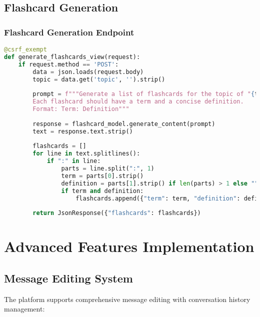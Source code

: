 \documentclass[12pt,a4paper]{article}
\begin{document}
\subsection{Flashcard Generation}

\subsubsection{Flashcard Generation Endpoint}

\begin{lstlisting}[language=Python, caption=Flashcard Generation System]
@csrf_exempt
def generate_flashcards_view(request):
    if request.method == 'POST':
        data = json.loads(request.body)
        topic = data.get('topic', '').strip()
        
        prompt = f"""Generate a list of flashcards for the topic of "{topic}". 
        Each flashcard should have a term and a concise definition. 
        Format: Term: Definition"""
        
        response = flashcard_model.generate_content(prompt)
        text = response.text.strip()
        
        flashcards = []
        for line in text.splitlines():
            if ":" in line:
                parts = line.split(":", 1)
                term = parts[0].strip()
                definition = parts[1].strip() if len(parts) > 1 else ""
                if term and definition:
                    flashcards.append({"term": term, "definition": definition})
        
        return JsonResponse({"flashcards": flashcards})
\end{lstlisting}

\section{Advanced Features Implementation}

\subsection{Message Editing System}

The platform supports comprehensive message editing with conversation history management:
\end{document}
